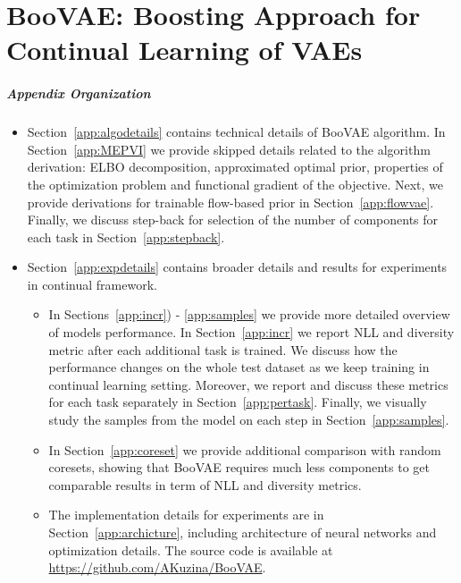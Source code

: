 \newpage

\chapter{BooVAE: Boosting Approach for Continual Learning of VAEs} 


\paragraph{Appendix Organization}
\begin{itemize}
    \item Section~\ref{app:algodetails} contains technical details of BooVAE algorithm. In Section~\ref{app:MEPVI} we provide skipped details related to the algorithm derivation: ELBO decomposition, approximated optimal prior, properties of the optimization problem and functional gradient of the objective. Next, we provide derivations for trainable flow-based prior in Section~\ref{app:flowvae}. Finally, we discuss step-back for selection of the number of components for each task in Section~\ref{app:stepback}.
    \item Section~\ref{app:expdetails} contains broader details and results for experiments in continual framework. 
    \begin{itemize}
        \item In Sections~\ref{app:incr}) - \ref{app:samples} we provide more detailed overview of models performance. In Section~\ref{app:incr} we report NLL and diversity metric after each additional task is trained. We discuss how the performance changes on the whole test dataset as we keep training in continual learning setting. Moreover, we report and discuss these metrics for each task separately in Section~\ref{app:pertask}. Finally, we visually study the samples from the model on each step in Section~\ref{app:samples}. 
        \item In Section~\ref{app:coreset}  we provide additional comparison with random coresets, showing that BooVAE requires much less components to get comparable results in term of NLL and diversity metrics.
        \item The implementation details for experiments are in Section~\ref{app:archicture}, including architecture of neural networks and optimization details.
        The source code is available at \url{https://github.com/AKuzina/BooVAE}.
    \end{itemize}
    
\end{itemize}


